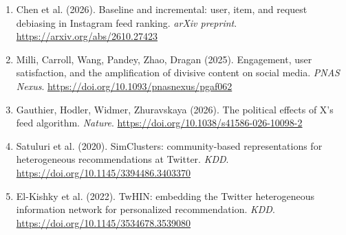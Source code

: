 {\begin{enumerate}[leftmargin=*, label=\arabic*., ref=\arabic*, itemsep=0.8em]
  \item\label{ref:chen2026} Chen et al. (2026). Baseline and incremental: user, item, and request debiasing in Instagram feed ranking. \textit{arXiv preprint}. \url{https://arxiv.org/abs/2610.27423} %
  \item\label{ref:milli2025} Milli, Carroll, Wang, Pandey, Zhao, Dragan (2025). Engagement, user satisfaction, and the amplification of divisive content on social media. \textit{PNAS Nexus}. \url{https://doi.org/10.1093/pnasnexus/pgaf062} %
  \item\label{ref:gauthier2026} Gauthier, Hodler, Widmer, Zhuravskaya (2026). The political effects of X's feed algorithm. \textit{Nature}. \url{https://doi.org/10.1038/s41586-026-10098-2} %
  \item\label{ref:satuluri2020} Satuluri et al. (2020). SimClusters: community-based representations for heterogeneous recommendations at Twitter. \textit{KDD}. \url{https://doi.org/10.1145/3394486.3403370} %
  \item\label{ref:elkishky2022} El-Kishky et al. (2022). TwHIN: embedding the Twitter heterogeneous information network for personalized recommendation. \textit{KDD}. \url{https://doi.org/10.1145/3534678.3539080} %
\end{enumerate}}
